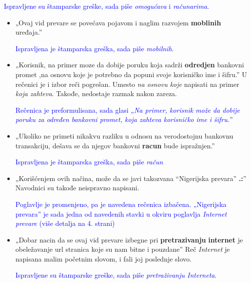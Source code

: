 \documentclass[a4paper]{report}
\newcommand{\odgovor}[1]{\textcolor{blue}{#1}}
\begin{document}
\begin{itemize}
\begin{itemize}
		\odgovor{Ispravljene su štamparske greške, sada piše \textit{omogućava} i \textit{računarima}.}
		
    \end{itemize}
    \begin{itemize}
        \item „Ovaj vid prevare se povećava pojavom i naglim razvojem \textbf{moblinih} uređaja.”
        
        \odgovor{Ispravljena je štamparska greška, sada piše \textit{mobilnih}.}
        
    \end{itemize}
    \begin{itemize}
        \item „Korisnik, na primer moze da dobije poruku koja sadrži \textbf{odredjen} bankovni promet ,na osnovu koje je potrebno da popuni svoje korisničko ime i šifru.”\newline
        U rečenici je i izbor reči pogrešan. Umesto  \textit{na osnovu koje} napisati na primer \textit{koja zahteva}. Takođe, nedostaje razmak nakon zareza.
        
        \odgovor{Rečenica je preformulisana, sada glasi „\textit{Na primer, korisnik može da dobije poruku za određen bankovni promet, koja zahteva korisničko ime i šifru.}”}
        
    \end{itemize}
    \begin{itemize}
        \item  „Ukoliko ne primeti nikakvu razliku u odnosu na verodostojnu bankovnu transakciju, dešava se da njegov bankovni \textbf{racun} bude ispražnjen.”
       
        \odgovor{Ispravljena je štamparska greška, sada piše \textit{račun}}
        
    \end{itemize}
    \begin{itemize}
        \item  „Korišćenjem ovih načina, može da se javi takozvana “Nigerijska prevara” \textbf{.:}”
        Navodnici su takođe neispravno napisani.
      
        \odgovor{Poglavlje je promenjeno, pa je navedena rečenica izbačena. „Nigerijska prevara” je sada jedna od navedenih stavki u okviru poglavlja \textit{Internet prevare} (više detalja na 4. strani)}
        
    \end{itemize}
    \begin{itemize}
        \item  „Dobar nacin da se ovaj vid prevare izbegne pri \textbf{pretrazivanju} \textbf{internet} je obeležavanje url stranica koje su nam bitne i pouzdane”\newline
    Reč \textit{Internet} je napisana malim početnim slovom, i fali joj poslednje slovo.
    	
    	\odgovor{Ispravljene su štamparske greške, sada piše \textit{pretraživanju Interneta}.}
    	
    \end{itemize}
\end{itemize}
\end{document}
